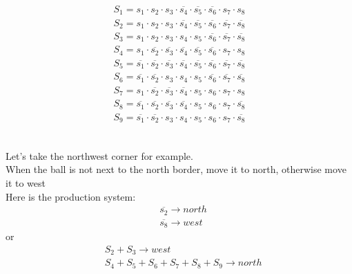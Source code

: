 \documentclass[paper=a4, fontsize=11pt]{scrartcl} %
\numberwithin{equation}{section} %
\numberwithin{figure}{section} %
\numberwithin{table}{section} %
\begin{document}
\begin{align*}
S_1 = s_1 \cdot s_2 \cdot s_3 \cdot \overline{s_4} \cdot \overline{s_5} \cdot \overline{s_6} \cdot s_7 \cdot s_8\\
S_2 = s_1 \cdot s_2 \cdot s_3 \cdot \overline{s_4} \cdot \overline{s_5} \cdot \overline{s_6} \cdot \overline{s_7} \cdot \overline{s_8}\\
S_3 = s_1 \cdot s_2 \cdot s_3 \cdot s_4 \cdot s_5 \cdot \overline{s_6} \cdot \overline{s_7} \cdot \overline{s_8}\\
S_4 = s_1 \cdot \overline{s_2} \cdot \overline{s_3} \cdot \overline{s_4} \cdot \overline{s_5} \cdot \overline{s_6} \cdot s_7 \cdot s_8\\
S_5 = \overline{s_1} \cdot \overline{s_2} \cdot \overline{s_3} \cdot \overline{s_4} \cdot \overline{s_5} \cdot \overline{s_6} \cdot \overline{s_7} \cdot \overline{s_8}\\
S_6 = \overline{s_1} \cdot \overline{s_2} \cdot s_3 \cdot s_4 \cdot s_5 \cdot \overline{s_6} \cdot \overline{s_7} \cdot \overline{s_8}\\
S_7 = s_1 \cdot \overline{s_2} \cdot \overline{s_3} \cdot \overline{s_4} \cdot s_5 \cdot s_6 \cdot s_7 \cdot s_8\\
S_8 = \overline{s_1} \cdot \overline{s_2} \cdot \overline{s_3} \cdot \overline{s_4} \cdot s_5 \cdot s_6 \cdot s_7 \cdot \overline{s_8}\\
S_9 = \overline{s_1} \cdot \overline{s_2} \cdot s_3 \cdot s_4 \cdot s_5 \cdot s_6 \cdot s_7 \cdot \overline{s_8}\\
\end{align*}


\subsection{}

Let's take the northwest corner for example.\\

When the ball is not next to the north border, move it to north, otherwise move it to west\\

Here is the production system:\\

\boldmath \begin{align*}
&\overline{s_2} \longrightarrow north\\
&\overline{s_8} \longrightarrow west
\end{align*}
or
\boldmath \begin{align*}
&S_2+S_3 \longrightarrow west\\
&S_4+S_5+S_6+S_7+S_8+S_9 \longrightarrow north
\end{align*}
\end{document}
